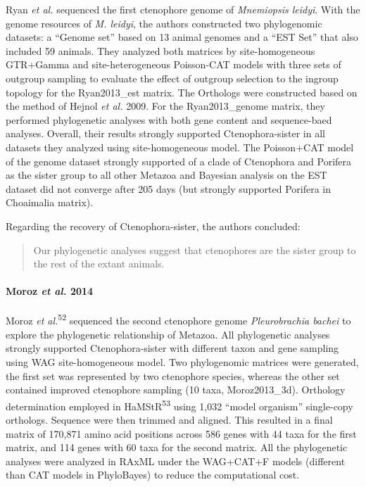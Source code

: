 \documentclass[]{article}
\let\oldparagraph\paragraph
\renewcommand{\paragraph}[1]{\oldparagraph{#1}\mbox{}}
\begin{document}
Ryan \emph{et al.} sequenced the first ctenophore genome of
\emph{Mnemiopsis leidyi}. With the genome resources of \emph{M. leidyi},
the authors constructed two phylogenomic datasets: a ``Genome set''
based on 13 animal genomes and a ``EST Set'' that also included 59
animals. They analyzed both matrices by site-homogeneous GTR+Gamma and
site-heterogeneous Poisson-CAT models with three sets of outgroup
sampling to evaluate the effect of outgroup selection to the ingroup
topology for the Ryan2013\_est matrix. The Orthologs were constructed
based on the method of Hejnol \emph{et al.} 2009. For the
Ryan2013\_genome matrix, they performed phylogenetic analyses with both
gene content and sequence-baed analyses. Overall, their results strongly
supported Ctenophora-sister in all datasets they analyzed using
site-homogeneous model. The Poisson+CAT model of the genome dataset
strongly supported of a clade of Ctenophora and Porifera as the sister
group to all other Metazoa and Bayesian analysis on the EST dataset did
not converge after 205 days (but strongly supported Porifera in
Choaimalia matrix).

Regarding the recovery of Ctenophora-sister, the authors concluded:

\begin{quote}
Our phylogenetic analyses suggest that ctenophores are the sister group
to the rest of the extant animals.
\end{quote}

\hypertarget{moroz-et-al.-2014}{%
\paragraph{\texorpdfstring{Moroz \emph{et al.}
2014}{Moroz et al. 2014}}\label{moroz-et-al.-2014}}

Moroz \emph{et al.}\textsuperscript{52} sequenced the second ctenophore
genome \emph{Pleurobrachia bachei} to explore the phylogenetic
relationship of Metazoa. All phylogenetic analyses strongly supported
Ctenophora-sister with different taxon and gene sampling using WAG
site-homogeneous model. Two phylogenomic matrices were generated, the
first set was represented by two ctenophore species, whereas the other
set contained improved ctenophore sampling (10 taxa, Moroz2013\_3d).
Orthology determination employed in HaMStR\textsuperscript{53} using
1,032 ``model organism'' single-copy orthologs. Sequence were then
trimmed and aligned. This resulted in a final matrix of 170,871 amino
acid positions across 586 genes with 44 taxa for the first matrix, and
114 genes with 60 taxa for the second matrix. All the phylogenetic
analyses were analyzed in RAxML under the WAG+CAT+F models (different
than CAT models in PhyloBayes) to reduce the computational cost.
\end{document}
